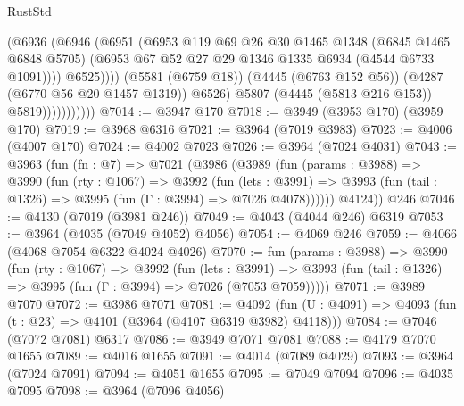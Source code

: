 \begin{lexlean}{RustStd}
\begin{coremodule}
                                (@6936
                                  (@6946
                                    (@6951
                                      (@6953
                                        @119
                                        @69
                                        @26
                                        @30
                                        @1465
                                        @1348
                                        (@6845 @1465 @6848 @5705)
                                        (@6953
                                          @67
                                          @52
                                          @27
                                          @29
                                          @1346
                                          @1335
                                          @6934
                                          (@4544 @6733 @1091))))
                                    @6525))))
                            (@5581 (@6759 @18))
                            (@4445 (@6763 @152 @56))
                            (@4287 (@6770 @56 @20 @1457 @1319))
                            @6526)
                          @5807
                          (@4445 (@5813 @216 @153))
                          @5819)))))))))))
@7014 := @3947 @170
@7018 := @3949 (@3953 @170) (@3959 @170)
@7019 := @3968 @6316
@7021 := @3964 (@7019 @3983)
@7023 := @4006 (@4007 @170)
@7024 := @4002 @7023
@7026 := @3964 (@7024 @4031)
@7043 := @3963
    (fun (fn : @7) =>
    @7021
      (@3986
        (@3989
          (fun (params : @3988) =>
          @3990
            (fun (rty : @1067) =>
            @3992
              (fun (lets : @3991) =>
              @3993 (fun (tail : @1326) => @3995 (fun (Γ : @3994) => @7026 @4078))))))
        @4124))
    @246
@7046 := @4130 (@7019 (@3981 @246))
@7049 := @4043 (@4044 @246) @6319
@7053 := @3964 (@4035 (@7049 @4052) @4056)
@7054 := @4069 @246
@7059 := @4066 (@4068 @7054 @6322 @4024 @4026)
@7070 := fun (params : @3988) =>
  @3990
    (fun (rty : @1067) =>
    @3992
      (fun (lets : @3991) =>
      @3993 (fun (tail : @1326) => @3995 (fun (Γ : @3994) => @7026 (@7053 @7059)))))
@7071 := @3989 @7070
@7072 := @3986 @7071
@7081 := @4092 (fun (U : @4091) => @4093 (fun (t : @23) => @4101 (@3964 (@4107 @6319 @3982) @4118)))
@7084 := @7046 (@7072 @7081) @6317
@7086 := @3949 @7071 @7081
@7088 := @4179 @7070 @1655
@7089 := @4016 @1655
@7091 := @4014 (@7089 @4029)
@7093 := @3964 (@7024 @7091)
@7094 := @4051 @1655
@7095 := @7049 @7094
@7096 := @4035 @7095
@7098 := @3964 (@7096 @4056)

\end{coremodule}
\end{lexlean}
